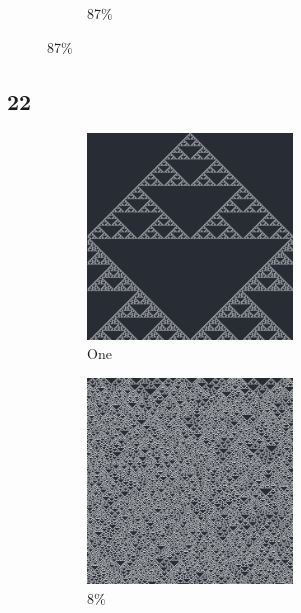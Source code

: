 \documentclass[12pt, fleqn]{report}                             %
\theoremstyle{break}                                            %
\begin{document}
\begin{figure}[ht!]
\begin{subfigure}[b]{0.4\linewidth}
          \caption{87\%}
        \end{subfigure}
      \end{figure}


      \clearpage
      \subsection{22}
      \begin{figure}[ht!]
        \centering
        \begin{subfigure}[b]{0.4\linewidth}
          \includegraphics[width=0.6\textwidth]{Images/22/a.png}
          \caption{One}
        \end{subfigure}
        \begin{subfigure}[b]{0.4\linewidth}
          \includegraphics[width=0.6\textwidth]{Images/22/b.png}
          \caption{8\%}
        \end{subfigure}
        \begin{subfigure}[b]{0.4\linewidth}

\end{subfigure}
\end{figure}
\end{document}
